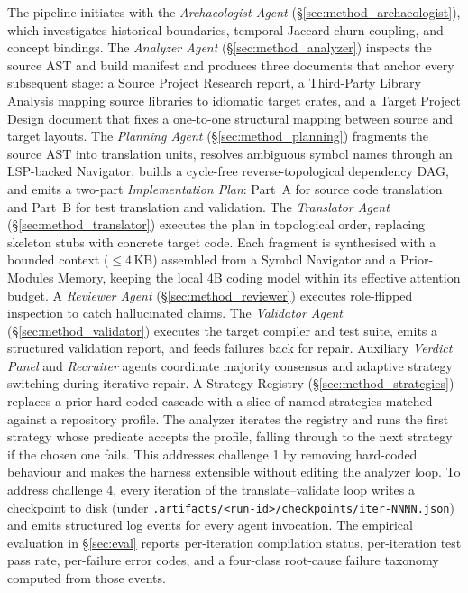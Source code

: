 The pipeline initiates with the \emph{Archaeologist Agent}
(§\ref{sec:method_archaeologist}), which investigates historical boundaries,
temporal Jaccard churn coupling, and concept bindings. The \emph{Analyzer Agent}
(§\ref{sec:method_analyzer}) inspects the source AST and build manifest and
produces three documents that anchor every subsequent stage: a Source Project
Research report, a Third-Party Library Analysis mapping source libraries to
idiomatic target crates, and a Target Project Design document that fixes a
one-to-one structural mapping between source and target layouts. The
\emph{Planning Agent} (§\ref{sec:method_planning}) fragments the source AST
into translation units, resolves ambiguous symbol names through an LSP-backed
Navigator, builds a cycle-free reverse-topological dependency DAG, and emits a
two-part \emph{Implementation Plan}: Part~A for source code translation and
Part~B for test translation and validation. The \emph{Translator Agent}
(§\ref{sec:method_translator}) executes the plan in topological order,
replacing skeleton stubs with concrete target code. Each fragment is synthesised
with a bounded context ($\le 4\,\text{KB}$) assembled from a Symbol Navigator
and a Prior-Modules Memory, keeping the local 4B coding model within its
effective attention budget. A \emph{Reviewer Agent}
(§\ref{sec:method_reviewer}) executes role-flipped inspection to catch
hallucinated claims. The \emph{Validator Agent} (§\ref{sec:method_validator})
executes the target compiler and test suite, emits a structured validation
report, and feeds failures back for repair. Auxiliary \emph{Verdict Panel} and
\emph{Recruiter} agents coordinate majority consensus and adaptive strategy
switching during iterative repair.
A Strategy Registry (§\ref{sec:method_strategies}) replaces a prior
hard-coded cascade with a slice of named strategies matched against a
repository profile. The analyzer iterates the registry and runs the
first strategy whose predicate accepts the profile, falling through to
the next strategy if the chosen one fails. This addresses challenge 1
by removing hard-coded behaviour and makes the harness extensible
without editing the analyzer loop. To address challenge 4, every
iteration of the translate--validate loop writes a checkpoint to disk
(under \texttt{.artifacts/<run-id>/checkpoints/iter-NNNN.json}) and emits
structured log events for every agent invocation. The empirical
evaluation in §\ref{sec:eval} reports per-iteration compilation status,
per-iteration test pass rate, per-failure error codes, and a four-class
root-cause failure taxonomy computed from those events.

